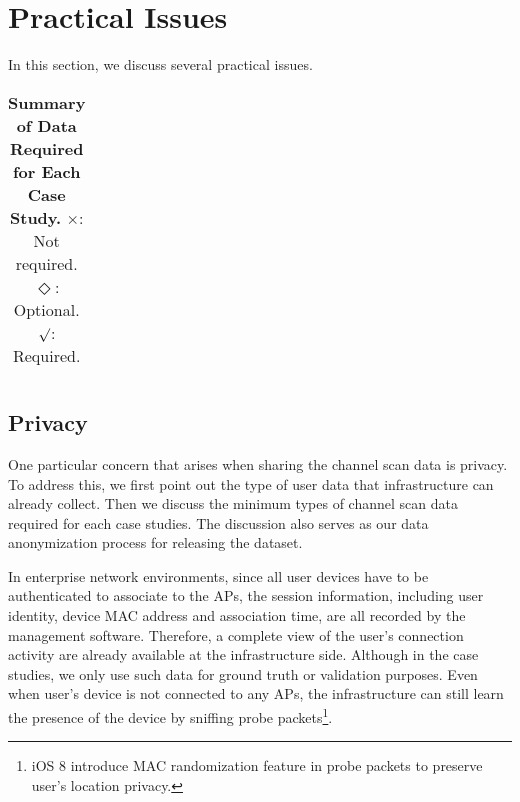 \section{Practical Issues}
\label{sec:discussion}

In this section, we discuss several practical issues.

\begin{table*}[t!]
  \centering
  \begin{tabular}{cccccccc}
    
  \end{tabular}
  \caption{\textbf{Summary of Data Required for Each Case Study.} $\times$: Not
  required. $\Diamond$: Optional. $\surd$: Required.}
  \label{tab:privacy}
\end{table*}

\subsection{Privacy}
\label{subsec:privacy}

One particular concern that arises when sharing the channel scan data is
privacy. To address this, we first point out the type of user data that
infrastructure can already collect. Then we discuss the minimum types of channel
scan data required for each case studies. The discussion also serves as our data
anonymization process for releasing the dataset.

In enterprise network environments, since all user devices have to be
authenticated to associate to the APs, the \wifi{} session information, including
user identity, device MAC address and association time, are all recorded by the
management software. Therefore, a complete view of the user's \wifi{} connection
activity are already available at the infrastructure side. Although in the case
studies, we only use such data for ground truth or validation purposes. Even
when user's device is not connected to any APs, the infrastructure can still
learn the presence of the device by sniffing probe packets\footnote{iOS 8
introduce MAC randomization feature in probe packets to preserve user's location
privacy.}.

